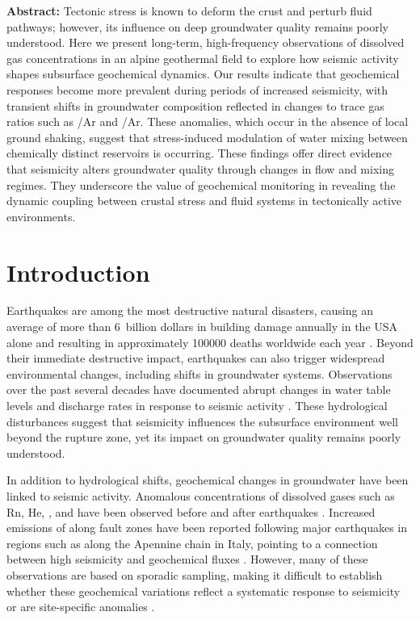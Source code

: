 \noindent
\textbf{Abstract:} Tectonic stress is known to deform the crust and perturb fluid pathways; however, its influence on deep groundwater quality remains poorly understood.
Here we present long-term, high-frequency observations of dissolved gas concentrations in an alpine geothermal field to explore how seismic activity shapes subsurface geochemical dynamics.
Our results indicate that geochemical responses become more prevalent during periods of increased seismicity, with transient shifts in groundwater composition reflected in changes to trace gas ratios such as /Ar and /Ar.
These anomalies, which occur in the absence of local ground shaking, suggest that stress-induced modulation of water mixing between chemically distinct reservoirs is occurring.
These findings offer direct evidence that seismicity alters groundwater quality through changes in flow and mixing regimes.
They underscore the value of geochemical monitoring in revealing the dynamic coupling between crustal stress and fluid systems in tectonically active environments.

\section{Introduction}
Earthquakes are among the most destructive natural disasters, causing an average of more than $6$~billion dollars in building damage annually in the USA alone and resulting in approximately \num{100000} deaths worldwide each year \citep{bilham2004urban, fema2017hazus}.
Beyond their immediate destructive impact, earthquakes can also trigger widespread environmental changes, including shifts in groundwater systems.
Observations over the past several decades have documented abrupt changes in water table levels and discharge rates in response to seismic activity \citep{shi2013coseismic, montgomery2003streamflow, king2002earthquake}.
These hydrological disturbances suggest that seismicity influences the subsurface environment well beyond the rupture zone, yet its impact on groundwater quality remains poorly understood.

In addition to hydrological shifts, geochemical changes in groundwater have been linked to seismic activity.
Anomalous concentrations of dissolved gases such as Rn, He, , and  have been observed before and after earthquakes \citep{segovia1989radon, igarashi1995radon, toutain1999seismo}.
Increased emissions of  along fault zones have been reported following major earthquakes in regions such as along the Apennine chain in Italy, pointing to a connection between high seismicity and geochemical fluxes \citep{chiodini2020co2}.
However, many of these observations are based on sporadic sampling, making it difficult to establish whether these geochemical variations reflect a systematic response to seismicity or are site-specific anomalies \citep{toutain1999seismo}.

